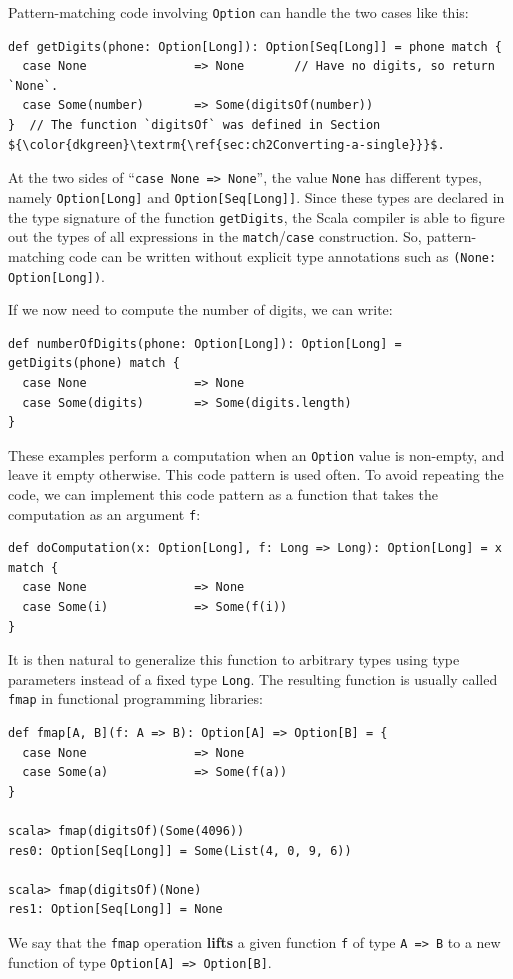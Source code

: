 Pattern-matching code involving \lstinline!Option! can handle the
two cases like this:
\begin{lstlisting}[mathescape=true]
def getDigits(phone: Option[Long]): Option[Seq[Long]] = phone match {
  case None               => None       // Have no digits, so return `None`.
  case Some(number)       => Some(digitsOf(number))
}  // The function `digitsOf` was defined in Section ${\color{dkgreen}\textrm{\ref{sec:ch2Converting-a-single}}}$.
\end{lstlisting}

At the two sides of \textsf{``}\lstinline!case None => None!\textsf{''}, the value
\lstinline!None! has different types, namely \lstinline!Option[Long]!
and \lstinline!Option[Seq[Long]]!. Since these types are declared
in the type signature of the function \lstinline!getDigits!, the
Scala compiler is able to figure out the types of all expressions
in the \lstinline!match!/\lstinline!case! construction. So, pattern-matching
code can be written without explicit type annotations
such as \lstinline!(None: Option[Long])!.

If we now need to compute the number of digits, we can write:
\begin{lstlisting}
def numberOfDigits(phone: Option[Long]): Option[Long] = getDigits(phone) match {
  case None               => None
  case Some(digits)       => Some(digits.length)
}
\end{lstlisting}

These examples perform a computation when an \lstinline!Option! value
is non-empty, and leave it empty otherwise. This code pattern is used
often. To avoid repeating the code, we can implement this code pattern
as a function that takes the computation as an argument \lstinline!f!:
\begin{lstlisting}
def doComputation(x: Option[Long], f: Long => Long): Option[Long] = x match {
  case None               => None
  case Some(i)            => Some(f(i))
}
\end{lstlisting}
It is then natural to generalize this function to arbitrary types
using type parameters instead of a fixed type \lstinline!Long!. The
resulting function is usually called \lstinline!fmap! in functional
programming libraries:
\begin{lstlisting}
def fmap[A, B](f: A => B): Option[A] => Option[B] = {
  case None               => None
  case Some(a)            => Some(f(a))
}

scala> fmap(digitsOf)(Some(4096))
res0: Option[Seq[Long]] = Some(List(4, 0, 9, 6))

scala> fmap(digitsOf)(None)
res1: Option[Seq[Long]] = None
\end{lstlisting}
We say that the \lstinline!fmap! operation \textbf{lifts}
a given function \lstinline!f! of type \lstinline!A => B! to a new
function of type \lstinline!Option[A] => Option[B]!. 

